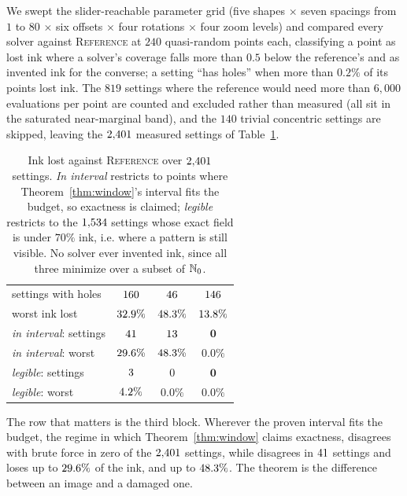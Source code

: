 We swept the slider-reachable parameter grid (five shapes $\times$ seven
spacings from $1$ to $80$ $\times$ six offsets $\times$ four rotations
$\times$ four zoom levels) and compared every solver against
\textsc{Reference} at $240$ quasi-random points each, classifying a point as
lost ink where a solver's coverage falls more than $0.5$ below the reference's
and as invented ink for the converse; a setting ``has holes'' when more than
$0.2\%$ of its points lost ink. The $819$ settings where the reference would
need more than $6{,}000$ evaluations per point are counted and excluded rather
than measured (all sit in the saturated near-marginal band), and the $140$
trivial concentric settings are skipped, leaving the $2{,}401$ measured
settings of Table~\ref{tab:fidelity}.

\begin{table}[t]
  \centering
  \small
  \caption{Ink lost against \textsc{Reference} over $2{,}401$ settings.
  \emph{In interval} restricts to points where Theorem~\ref{thm:window}'s interval
  fits the budget, so exactness is claimed; \emph{legible} restricts to the
  $1{,}534$ settings whose exact field is under $70\%$ ink, i.e. where a
  pattern is still visible. No solver ever invented ink, since all three minimize
  over a subset of $\mathbb{N}_0$.}
  \label{tab:fidelity}
  \begin{tabular}{lccc}
    \toprule
    & \sweep{} & \loose{} & \ours{} \\
    \midrule
    settings with holes            & $160$ & $46$ & $146$ \\
    worst ink lost                 & $32.9\%$ & $48.3\%$ & $13.8\%$ \\
    \midrule
    \emph{in interval}: settings   & $41$ & $13$ & $\mathbf{0}$ \\
    \emph{in interval}: worst      & $29.6\%$ & $48.3\%$ & $\mathbf{0.0\%}$ \\
    \midrule
    \emph{legible}: settings       & $3$ & $0$ & $\mathbf{0}$ \\
    \emph{legible}: worst          & $4.2\%$ & $0.0\%$ & $\mathbf{0.0\%}$ \\
    \bottomrule
  \end{tabular}
\end{table}

The row that matters is the third block. Wherever the proven interval fits the
budget, the regime in which Theorem~\ref{thm:window} claims exactness, \ours{}
disagrees with brute force in zero of the $2{,}401$ settings, while
\sweep{} disagrees in $41$ settings and loses up to
$29.6\%$ of the ink, and \loose{} up to $48.3\%$. The
theorem is the difference between an image and a damaged one.

